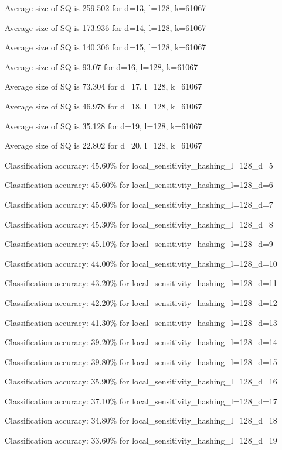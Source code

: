 \documentclass[12pt]{article}
\begin{document}
\begin{enumerate}[label=(\alph*)]
    Average size of SQ is 259.502 for d=13, l=128, k=61067

    Average size of SQ is 173.936 for d=14, l=128, k=61067

    Average size of SQ is 140.306 for d=15, l=128, k=61067
    
    Average size of SQ is 93.07 for d=16, l=128, k=61067
    
    Average size of SQ is 73.304 for d=17, l=128, k=61067
    
    Average size of SQ is 46.978 for d=18, l=128, k=61067
    
    Average size of SQ is 35.128 for d=19, l=128, k=61067
    
    Average size of SQ is 22.802 for d=20, l=128, k=61067
    

    Classification accuracy: 45.60\% for local\_sensitivity\_hashing\_l=128\_d=5

    Classification accuracy: 45.60\% for local\_sensitivity\_hashing\_l=128\_d=6

    Classification accuracy: 45.60\% for local\_sensitivity\_hashing\_l=128\_d=7

    Classification accuracy: 45.30\% for local\_sensitivity\_hashing\_l=128\_d=8

    Classification accuracy: 45.10\% for local\_sensitivity\_hashing\_l=128\_d=9

    Classification accuracy: 44.00\% for local\_sensitivity\_hashing\_l=128\_d=10

    Classification accuracy: 43.20\% for local\_sensitivity\_hashing\_l=128\_d=11

    Classification accuracy: 42.20\% for local\_sensitivity\_hashing\_l=128\_d=12

    Classification accuracy: 41.30\% for local\_sensitivity\_hashing\_l=128\_d=13
    
    Classification accuracy: 39.20\% for local\_sensitivity\_hashing\_l=128\_d=14
    
    Classification accuracy: 39.80\% for local\_sensitivity\_hashing\_l=128\_d=15
    
    Classification accuracy: 35.90\% for local\_sensitivity\_hashing\_l=128\_d=16
    
    Classification accuracy: 37.10\% for local\_sensitivity\_hashing\_l=128\_d=17
    
    Classification accuracy: 34.80\% for local\_sensitivity\_hashing\_l=128\_d=18
    
    Classification accuracy: 33.60\% for local\_sensitivity\_hashing\_l=128\_d=19
    

\end{enumerate}
\end{document}
